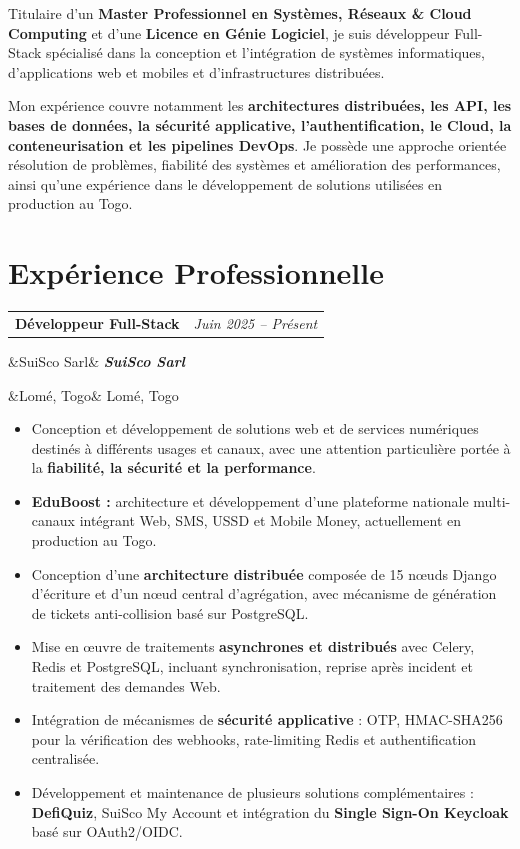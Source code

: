 \documentclass[10pt,a4paper]{article}
\makeatletter
\newcommand{\cventry}[4]{%
    \needspace{4\baselineskip}%
    \noindent
    \begin{tabularx}{\linewidth}{
        @{}
        X
        >{\raggedleft\arraybackslash}p{3.15cm}
        @{}
    }
        \textbf{\large #1}
        &
        {\small\color{secondary}\textit{#2}}
    \end{tabularx}
    \par
    \ifx&#3&
    \else
        \noindent
        \textbf{\textit{#3}}
        \par
    \fi
    \ifx&#4&
    \else
        \noindent
        {\small #4}
        \par
    \fi
    \vspace{2.5pt}%
}
\makeatother
\begin{document}
Titulaire d'un
\textbf{Master Professionnel en Systèmes, Réseaux \& Cloud Computing}
et d'une
\textbf{Licence en Génie Logiciel},
je suis développeur Full-Stack spécialisé dans la conception
et l'intégration de systèmes informatiques, d'applications web
et mobiles et d'infrastructures distribuées.

Mon expérience couvre notamment les
\textbf{architectures distribuées, les API, les bases de données,
la sécurité applicative, l'authentification, le Cloud,
la conteneurisation et les pipelines DevOps}.
Je possède une approche orientée résolution de problèmes,
fiabilité des systèmes et amélioration des performances,
ainsi qu'une expérience dans le développement de solutions
utilisées en production au Togo.


\section{Expérience Professionnelle}

\cventry
{Développeur Full-Stack}
{Juin 2025 -- Présent}
{SuiSco Sarl}
{Lomé, Togo}

\begin{itemize}

    \item Conception et développement de solutions web et de services
    numériques destinés à différents usages et canaux, avec une attention
    particulière portée à la \textbf{fiabilité, la sécurité et la performance}.

    \item \textbf{EduBoost :} architecture et développement d'une plateforme
    nationale multi-canaux intégrant Web, SMS, USSD et Mobile Money,
    actuellement en production au Togo.

    \item Conception d'une \textbf{architecture distribuée} composée de
    15 nœuds Django d'écriture et d'un nœud central d'agrégation,
    avec mécanisme de génération de tickets anti-collision basé sur PostgreSQL.

    \item Mise en œuvre de traitements \textbf{asynchrones et distribués}
    avec Celery, Redis et PostgreSQL, incluant synchronisation,
    reprise après incident et traitement des demandes Web.

    \item Intégration de mécanismes de \textbf{sécurité applicative} :
    OTP, HMAC-SHA256 pour la vérification des webhooks,
    rate-limiting Redis et authentification centralisée.

    \item Développement et maintenance de plusieurs solutions complémentaires :
    \textbf{DefiQuiz}, SuiSco My Account et intégration du
    \textbf{Single Sign-On Keycloak} basé sur OAuth2/OIDC.

\end{itemize}
\end{document}
